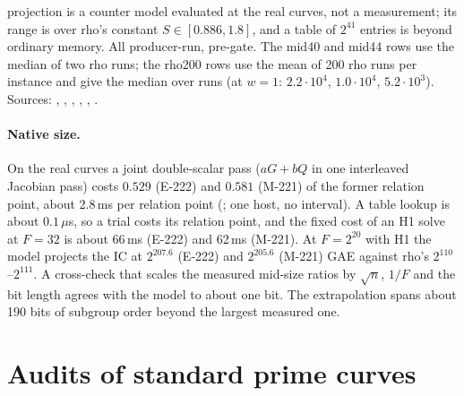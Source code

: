 \begin{table}[t]
{projection is a counter model evaluated at the real curves, not a
measurement; its range is over rho's constant $S\in[0.886,1.8]$, and a
table of $2^{41}$ entries is beyond ordinary memory. All producer-run,
pre-gate. The mid40 and mid44 rows use the median of two rho runs; the
rho200 rows use the mean of 200 rho runs per instance and give the median
over runs (at $w=1$: $2.2\cdot10^4$, $1.0\cdot10^4$, $5.2\cdot10^3$).
Sources: ,
,
,
,
,
.}
\label{tab:pt-e222}
\end{table}

\paragraph{Native size.} On the real curves a joint double-scalar pass
($aG+bQ$ in one interleaved Jacobian pass) costs $0.529$ (E-222) and $0.581$
(M-221) of the former relation point, about 2.8\,ms per relation point
(; one host, no
interval). A table lookup is about $0.1\,\mu$s, so a trial costs its relation
point, and the fixed cost of an H1 solve at $F=32$ is about 66\,ms (E-222) and
62\,ms (M-221). At $F=2^{20}$ with H1 the model projects the IC at $2^{207.6}$
(E-222) and $2^{205.6}$ (M-221) GAE against rho's $2^{110}$--$2^{111}$. A
cross-check that scales the measured mid-size ratios by $\sqrt{n}$, $1/F$
and the bit length agrees with the model to about one bit. The extrapolation
spans about 190 bits of subgroup order beyond the largest measured one.

\section{Audits of standard prime curves}\label{sec:pt-standard}

